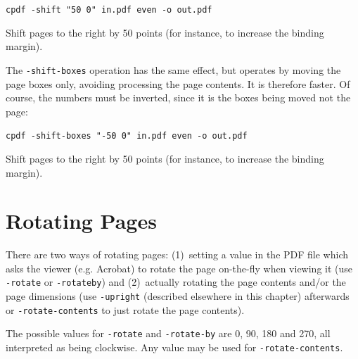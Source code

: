 \documentclass{book}
\begin{document}
  \begin{framed}
  \small\noindent\verb!cpdf -shift "50 0" in.pdf even -o out.pdf!

  \vspace{2.5mm}

  \noindent Shift pages to the right by 50 points (for instance, to increase
the binding margin).\end{framed}

\noindent The \texttt{-shift-boxes} operation has the same effect, but operates by moving the page boxes only, avoiding processing the page contents. It is therefore faster. Of course, the numbers must be inverted, since it is the boxes being moved not the page:

  \begin{framed}
  \small\noindent\verb!cpdf -shift-boxes "-50 0" in.pdf even -o out.pdf!

  \vspace{2.5mm}

  \noindent Shift pages to the right by 50 points (for instance, to increase
the binding margin).\end{framed}

  \section{Rotating Pages}

There are two ways of rotating pages: (1)~setting a value in the PDF file which
asks the viewer (e.g. Acrobat) to rotate the page on-the-fly when viewing it
(use \texttt{-rotate} or \texttt{-rotateby}) and (2)~actually rotating the page
contents and/or the page dimensions (use \texttt{-upright} (described elsewhere in this chapter) afterwards or
\texttt{-rotate-contents} to just rotate the page contents).

  The possible values for \texttt{-rotate} and \texttt{-rotate-by} are 0, 90,
180 and 270, all interpreted as being clockwise. Any value may be used for
\texttt{-rotate-contents}.
  
\end{document}

